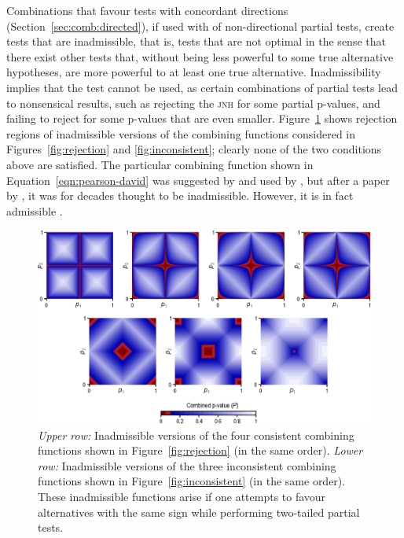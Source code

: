Combinations that favour tests with concordant directions (Section~\ref{sec:comb:directed}), if used with of non-directional partial tests, create tests that are inadmissible, that is, tests that are not optimal in the sense that there exist other tests that, without being less powerful to some true alternative hypotheses, are more powerful to at least one true alternative. Inadmissibility implies that the test cannot be used, as certain combinations of partial tests lead to nonsensical results, such as rejecting the \textsc{jnh} for some partial p-values, and failing to reject for some p-values that are even smaller. Figure~\ref{fig:inadmissible} shows rejection regions of inadmissible versions of the combining functions considered in Figures~\ref{fig:rejection} and \ref{fig:inconsistent}; clearly none of the two conditions above are satisfied. The particular combining function shown in Equation~\ref{eqn:pearson-david} was suggested by \citet{Pearson1933} and used by \citet{David1934}, but after a paper by \citet{Birnbaum1954}, it was for decades thought to be inadmissible. However, it is in fact admissible \citep{Owen2009}.

\begin{figure}[!p]
\begin{center}
\centerline{\includegraphics[scale=.8]{images/inadmissible.eps}}
\end{center}
\caption{\emph{Upper row:} Inadmissible versions of the four consistent combining functions shown in Figure~\ref{fig:rejection} (in the same order). \emph{Lower row:} Inadmissible versions of the three inconsistent combining functions shown in Figure~\ref{fig:inconsistent} (in the same order). These inadmissible functions arise if one attempts to favour alternatives with the same sign while performing two-tailed partial tests.}
\label{fig:inadmissible}
\end{figure}

